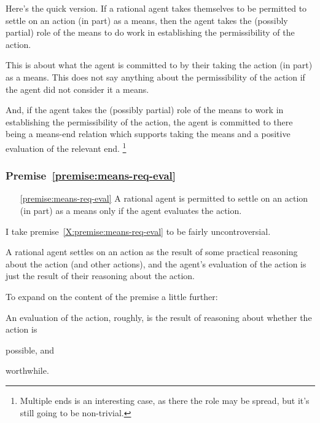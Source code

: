 \documentclass[10pt]{article}
\newcommand{\hozlinedash}[0]{%
  \noindent\hdashrule[0.5ex][c]{\textwidth}{.1pt}{2.5pt}
}
\begin{document}
\hozlinedash

Here's the quick version.
If a rational agent takes themselves to be permitted to settle on an action (in part) as a means, then the agent takes the (possibly partial) role of the means to do work in establishing the permissibility of the action.

This is about what the agent is committed to by their taking the action (in part) as a means.
This does not say anything about the permissibility of the action if the agent did not consider it a means.

And, if the agent takes the (possibly partial) role of the means to work in establishing the permissibility of the action, the agent is committed to there being a means-end relation which supports taking the means and a positive evaluation of the relevant end.\nolinebreak
\footnote{Multiple ends is an interesting case, as there the role may be spread, but it's still going to be non-trivial.}

\newpage

\subsubsection{Premise~\ref{premise:means-req-eval}}


\begin{enumerate}
\item[\ref{premise:means-req-eval}] A rational agent is permitted to settle on an action (in part) as a means only if the agent evaluates the action.
\end{enumerate}

I take premise~\ref{X:premise:means-req-eval} to be fairly uncontroversial.

A rational agent settles on an action as the result of some practical reasoning about the action (and other actions), and the agent's evaluation of the action is just the result of their reasoning about the action.

To expand on the content of the premise a little further:

An evaluation of the action, roughly, is the result of reasoning about whether the action is
\begin{enumerate*}[label=\alph*)]
\item possible, and
\item worthwhile.
\end{enumerate*}
\end{document}
